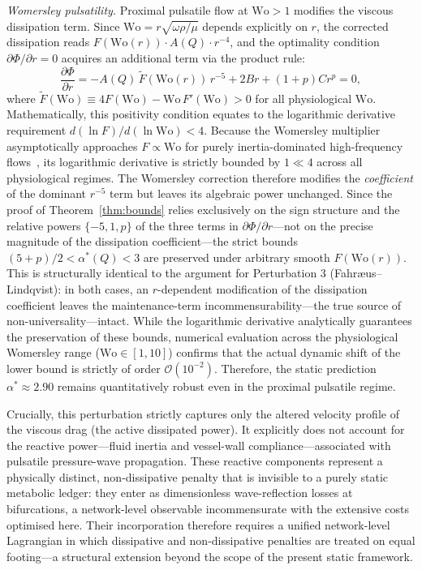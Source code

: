 \documentclass[11pt,a4paper]{article}
\theoremstyle{remark}
\begin{document}
\textit{Womersley pulsatility.} Proximal pulsatile flow at $\mathrm{Wo} > 1$
modifies the viscous dissipation term. Since $\mathrm{Wo} =
r\sqrt{\omega\rho/\mu}$
depends explicitly on $r$, the corrected dissipation reads
$F(\mathrm{Wo}(r))\cdot A(Q)\cdot r^{-4}$, and the optimality condition
$\partial\Phi/\partial r=0$
acquires an additional term via the product rule:
\[
\frac{\partial\Phi}{\partial r} = -A(Q)\,\tilde{F}(\mathrm{Wo}(r))\,r^{-5} + 2Br + (1+p)Cr^p = 0,
\]
where $\tilde{F}(\mathrm{Wo}) \equiv 4F(\mathrm{Wo}) -
\mathrm{Wo}\,F'(\mathrm{Wo}) > 0$ for all physiological $\mathrm{Wo}$.
Mathematically, this positivity condition equates to the logarithmic derivative
requirement $d(\ln F)/d(\ln \mathrm{Wo}) < 4$. Because the Womersley multiplier
asymptotically approaches $F \propto \mathrm{Wo}$ for purely inertia-dominated
high-frequency flows~\cite{Nichols2011}, its logarithmic derivative is strictly
bounded by $1 \ll 4$ across all physiological regimes. The Womersley correction
therefore modifies the \textit{coefficient} of the dominant $r^{-5}$
term but leaves its algebraic power unchanged. Since the proof of
Theorem~\ref{thm:bounds} relies exclusively on the sign structure and the
relative powers $\{-5, 1, p\}$
of the three terms in $\partial\Phi/\partial r$---not on the precise magnitude
of the dissipation coefficient---the strict bounds $(5+p)/2 < \alpha^*(Q) < 3$
are preserved under arbitrary smooth $F(\mathrm{Wo}(r))$. This is structurally
identical to the argument for Perturbation 3 (Fahr\ae us--Lindqvist): in both
cases, an $r$-dependent modification of the dissipation coefficient leaves the
maintenance-term incommensurability---the true source of
non-universality---intact. While the logarithmic derivative analytically
guarantees the preservation of these bounds, numerical evaluation across the
physiological Womersley range ($\mathrm{Wo} \in [1, 10]$) confirms that the
actual dynamic shift of the lower bound is strictly of order
$\mathcal{O}(10^{-2})$. Therefore, the static prediction $\alpha^* \approx 2.90$
remains quantitatively robust even in the proximal pulsatile regime.

Crucially, this perturbation strictly captures only the altered velocity
profile of the viscous drag (the active dissipated power). It explicitly
does not account for the reactive power---fluid inertia and vessel-wall
compliance---associated with pulsatile pressure-wave propagation. These
reactive components represent a physically distinct, non-dissipative
penalty that is invisible to a purely static metabolic ledger: they enter
as dimensionless wave-reflection losses at bifurcations, a network-level
observable incommensurate with the extensive costs optimised here. Their
incorporation therefore requires a unified network-level Lagrangian in
which dissipative and non-dissipative penalties are treated on equal
footing---a structural extension beyond the scope of the present static
framework.
\end{document}
